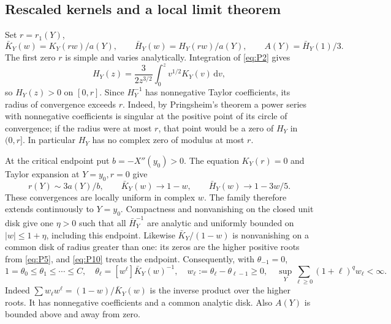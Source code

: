 \subsection{Rescaled kernels and a local limit theorem}\label{compact-normalization-and-uniform-lattice-estimates}

Set \(r=r_1(Y)\), \begin{equation}
\bar K_Y(w)=K_Y(rw)/a(Y),\qquad
 \bar H_Y(w)=H_Y(rw)/a(Y),\qquad
 A(Y)=\bar H_Y(1)/3.                               \label{eq:P9}
\end{equation} The first zero \(r\) is simple and varies analytically. Integration
of \eqref{eq:P2} gives \[
 H_Y(z)=\frac3{2z^{3/2}}\int_0^zv^{1/2}K_Y(v)\,\mathrm{d}v,
\] so \(H_Y(z)>0\) on \([0,r]\). Since \(H_Y^{-1}\) has nonnegative
Taylor coefficients, its radius of convergence exceeds \(r\). Indeed, by
Pringsheim's theorem a power series with nonnegative coefficients is
singular at the positive point of its circle of convergence; if the
radius were at most \(r\), that point would be a zero of \(H_Y\) in
\((0,r]\). In particular \(H_Y\) has no complex zero of modulus at most
\(r\).

At the critical endpoint put \(b=-X''(y_0)>0\). The equation
\(K_Y(r)=0\) and Taylor expansion at \(Y=y_0,r=0\) give \begin{equation}
r(Y)\sim3a(Y)/b,\qquad
 \bar K_Y(w)\longrightarrow1-w,\qquad
 \bar H_Y(w)\longrightarrow1-3w/5.                 \label{eq:P10}
\end{equation} These convergences are locally uniform in complex \(w\). The family
therefore extends continuously to \(Y=y_0\). Compactness and
nonvanishing on the closed unit disk give one \(\eta>0\) such that all
\(\bar H_Y^{-1}\) are analytic and uniformly bounded on
\(|w|\le1+\eta\), including this endpoint. Likewise \(\bar K_Y/(1-w)\)
is nonvanishing on a common disk of radius greater than one: its zeros
are the higher positive roots from \eqref{eq:P5}, and \eqref{eq:P10} treats the endpoint.
Consequently, with \(\theta_{-1}=0\), \begin{equation}
1=\theta_0\le\theta_1\le\cdots\le C,
 \quad \theta_\ell=[w^\ell]\bar K_Y(w)^{-1},
 \quad w_\ell:=\theta_\ell-\theta_{\ell-1}\ge0,
 \quad\sup_Y\sum_{\ell\ge0}(1+\ell)^q w_\ell<\infty.  \label{eq:P11}
\end{equation} Indeed \(\sum w_\ell w^\ell=(1-w)/\bar K_Y(w)\) is the inverse
product over the higher roots. It has nonnegative coefficients and a
common analytic disk. Also \(A(Y)\) is bounded above and away from zero.

